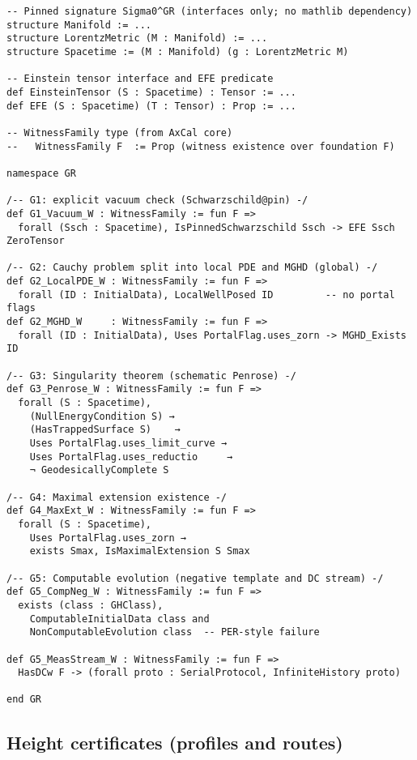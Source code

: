 \documentclass[11pt]{article}
\theoremstyle{definition}
\theoremstyle{remark}
\begin{document}
\begin{verbatim}
-- Pinned signature Sigma0^GR (interfaces only; no mathlib dependency)
structure Manifold := ...
structure LorentzMetric (M : Manifold) := ...
structure Spacetime := (M : Manifold) (g : LorentzMetric M)

-- Einstein tensor interface and EFE predicate
def EinsteinTensor (S : Spacetime) : Tensor := ...
def EFE (S : Spacetime) (T : Tensor) : Prop := ...

-- WitnessFamily type (from AxCal core)
--   WitnessFamily F  := Prop (witness existence over foundation F)

namespace GR

/-- G1: explicit vacuum check (Schwarzschild@pin) -/
def G1_Vacuum_W : WitnessFamily := fun F =>
  forall (Ssch : Spacetime), IsPinnedSchwarzschild Ssch -> EFE Ssch ZeroTensor

/-- G2: Cauchy problem split into local PDE and MGHD (global) -/
def G2_LocalPDE_W : WitnessFamily := fun F =>
  forall (ID : InitialData), LocalWellPosed ID         -- no portal flags
def G2_MGHD_W     : WitnessFamily := fun F =>
  forall (ID : InitialData), Uses PortalFlag.uses_zorn -> MGHD_Exists ID

/-- G3: Singularity theorem (schematic Penrose) -/
def G3_Penrose_W : WitnessFamily := fun F =>
  forall (S : Spacetime),
    (NullEnergyCondition S) →
    (HasTrappedSurface S)    →
    Uses PortalFlag.uses_limit_curve →
    Uses PortalFlag.uses_reductio     →
    ¬ GeodesicallyComplete S

/-- G4: Maximal extension existence -/
def G4_MaxExt_W : WitnessFamily := fun F =>
  forall (S : Spacetime),
    Uses PortalFlag.uses_zorn →
    exists Smax, IsMaximalExtension S Smax

/-- G5: Computable evolution (negative template and DC stream) -/
def G5_CompNeg_W : WitnessFamily := fun F =>
  exists (class : GHClass),
    ComputableInitialData class and
    NonComputableEvolution class  -- PER-style failure

def G5_MeasStream_W : WitnessFamily := fun F =>
  HasDCw F -> (forall proto : SerialProtocol, InfiniteHistory proto)

end GR
\end{verbatim}

\subsection{Height certificates (profiles and routes)}\label{app:certs}
\end{document}
